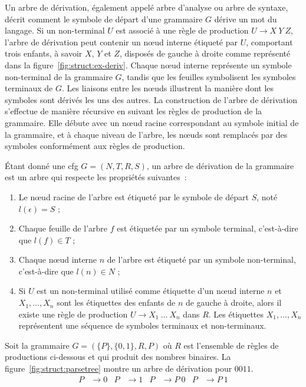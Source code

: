 Un arbre de dérivation, également appelé arbre d'analyse ou arbre de syntaxe, décrit comment le symbole de départ d'une grammaire $G$ dérive un mot du langage.
Si un non-terminal $U$ est associé à une règle de production $U \to X ~ Y ~ Z$, l'arbre de dérivation peut contenir un nœud interne étiqueté par $U$, comportant trois enfants, à savoir $X$, $Y$ et $Z$, disposés de gauche à droite comme représenté dans la figure~\ref{fig:struct:ex-deriv}.
Chaque nœud interne représente un symbole non-terminal de la grammaire $G$, tandis que les feuilles symbolisent les symboles terminaux de $G$.
Les liaisons entre les nœuds illustrent la manière dont les symboles sont dérivés les uns des autres.
La construction de l'arbre de dérivation s'effectue de manière récursive en suivant les règles de production de la grammaire. Elle débute avec un nœud racine correspondant au symbole initial de la grammaire, et à chaque niveau de l'arbre, les nœuds sont remplacés par des symboles conformément aux règles de production.

\begin{definition}
    Étant donné une \gls{cfg} $G = (N, T, R, S)$, un arbre de dérivation de la grammaire est un arbre qui respecte les propriétés suivantes :
    \begin{enumerate}
        \item Le nœud racine de l'arbre est étiqueté par le symbole de départ $S$, noté $l(\epsilon) = S$ ;
        \item Chaque feuille de l'arbre $f$ est étiquetée par un symbole terminal, c'est-à-dire que $l(f) \in T$ ;
        \item Chaque nœud interne $n$ de l'arbre est étiqueté par un symbole non-terminal, c'est-à-dire que $l(n) \in N$ ;
        \item Si $U$ est un non-terminal utilisé comme étiquette d'un nœud interne $n$ et $X_1, \dots, X_n$ sont les étiquettes des enfants de $n$ de gauche à droite, alors il existe une règle de production $U \to X_1 ~ \dots ~ X_n$ dans $R$.
        Les étiquettes $X_1, \dots, X_n$ représentent une séquence de symboles terminaux et non-terminaux.
    \end{enumerate}
\end{definition}

\begin{example}
    \label{ex:struct:cfg}
    Soit la grammaire $G = (\{P\}, \{0,1\}, R, P)$ où $R$ est l'ensemble de règles de productions ci-dessous et qui produit des nombres binaires.
    La figure~\ref{fig:struct:parsetree} montre un arbre de dérivation pour $0011$.
    \begin{align*}
        P & \to 0 & P & \to 1 & P & \to P~0 & P & \to P~1
    \end{align*}
\end{example}

